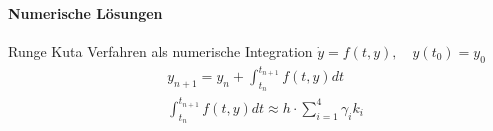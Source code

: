 \documentclass{beamer}
\begin{document}
 \begin{frame}
\framesubtitle{Numerische Lösungen}
    \begin{block}{Runge Kuta Verfahren als numerische Integration}
$\dot{y}=f(t,y), \quad  y(t_0)=y_0$
\begin{align}
& y_{n+1} = y_n + \int_{t_n}^{t_{n+1}} f(t, y) dt \\
&  \int_{t_n}^{t_{n+1}} f(t, y) dt \approx h \cdot \sum_{i=1}^4 \gamma_i k_i
\end{align}
    \end{block}
\end{frame}
\end{document}
